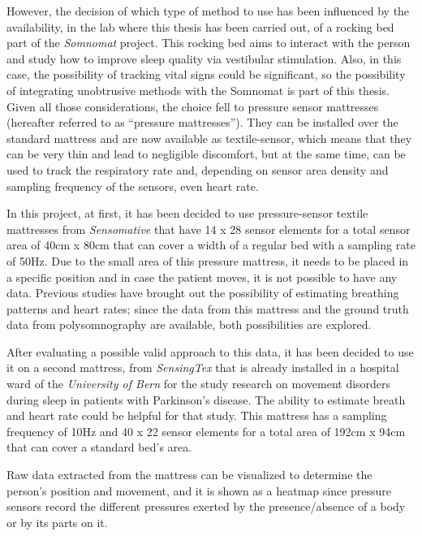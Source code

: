 However, the decision of which type of method to use has been influenced by the availability, in the lab where this thesis has been carried out, of a rocking bed part of the \textit{Somnomat}\cite{DevelopingSleep} project. This rocking bed aims to interact with the person and study how to improve sleep quality via vestibular stimulation. Also, in this case, the possibility of tracking vital signs could be significant, so the possibility of integrating unobtrusive methods with the Somnomat is part of this thesis.
Given all those considerations, the choice fell to pressure sensor mattresses (hereafter referred to as ``pressure mattresses'').
They can be installed over the standard mattress and are now available as textile-sensor, which means that they can be very thin and lead to negligible discomfort, but at the same time, can be used to track the respiratory rate and, depending on sensor area density and sampling frequency of the sensors, even heart rate. 

In this project, at first, it has been decided to use pressure-sensor textile mattresses from \textit{Sensomative} \cite{sensomativeUrl} that have 14 x 28 sensor elements for a total sensor area of 40cm x 80cm that can cover a width of a regular bed with a sampling rate of 50Hz. Due to the small area of this pressure mattress, it needs to be placed in a specific position and in case the patient moves, it is not possible to have any data. Previous studies have brought out the possibility of estimating breathing patterns and heart rates; since the data from this mattress and the ground truth data from polysomnography are available, both possibilities are explored.

After evaluating a possible valid approach to this data, it has been decided to use it on a second mattress, from \textit{SensingTex} \cite{SensingConnectivity} that is already installed in a hospital ward of the \textit{University of Bern} for the study research on movement disorders during sleep in patients with Parkinson’s disease. The ability to estimate breath and heart rate could be helpful for that study.
This mattress has a sampling frequency of 10Hz and 40 x 22 sensor elements for a total area of 192cm x 94cm that can cover a standard bed's area.

Raw data extracted from the mattress can be visualized to determine the person's position and movement, and it is shown as a heatmap since pressure sensors record the different pressures exerted by the presence/absence of a body or by its parts on it. 

